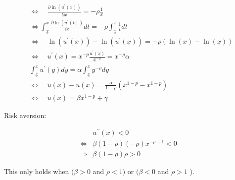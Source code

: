{{\begin{enumerate}[label=(\alph*)]
{$$
\begin{aligned}
& \Longleftrightarrow \quad \frac{\partial \ln \left(u^{\prime}(x)\right)}{\partial x}=-\rho \frac{1}{x} \\
& \Longleftrightarrow \int_{\underline{x}}^{x} \frac{\partial \ln \left(u^{\prime}(t)\right)}{\partial t} d t=-\rho \int_{\underline{x}}^{x} \frac{1}{t} d t \\
& \Longleftrightarrow \quad \ln \left(u^{\prime}(x)\right)-\ln \left(u^{\prime}(\underline{x})\right)=-\rho (\ln (x)-\ln (\underline{x})) \\
& \Leftrightarrow \quad u^{\prime}(x)=x^{-p} \frac{u^{\prime}(\underline{x})}{\underline{x}^{-\rho}}=x^{-\rho} \alpha \\
& \int_{\underline{x}}^{x} u^{\prime}(y) d y=\alpha \int_{\underline{x}}^{x} y^{-\rho} d y \\
& \Leftrightarrow \quad u(x)-u(\underline{x})=\frac{\alpha}{1-\rho}\left(x^{1-p}-\underline{x}^{1-p}\right) \\
& \Leftrightarrow \quad u(x)=\beta x^{1-p} + \gamma
\end{aligned}
$$

Risk aversion:

$$
\begin{aligned}
& u^{\prime \prime}(x)<0 \\
\Leftrightarrow &\beta(1-\rho)(-\rho) x^{-\rho-1}<0 \\
\Rightarrow &\beta(1-\rho) {\rho}>0
\end{aligned}
$$

This only holds when $(\beta>0$ and $\rho<1)$ or $(\beta<0$ and $\rho>1$ ).
}
\end{enumerate}
}
}

